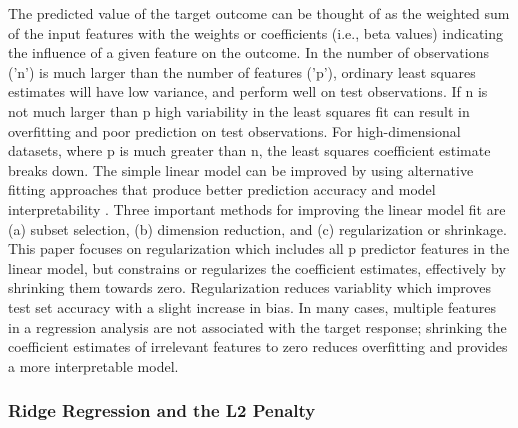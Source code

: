 \documentclass[sigconf]{acmart}
\begin{document}
The predicted value of the target outcome can be thought of as the weighted 
sum of the input features with the weights or coefficients (i.e., beta values) 
indicating the influence of a given feature on the outcome. In the number of
observations ('n') is much larger than the number of features ('p'), ordinary 
least squares estimates will have low variance, and perform well on test
observations. If n is not much larger than p high variability in the least
squares fit can result in overfitting and poor prediction on test observations.
For high-dimensional datasets, where p is much greater than n, the least
squares coefficient estimate breaks down. The simple linear model can be
improved by using alternative fitting approaches that produce better 
prediction accuracy and model interpretability \cite{statlearn13}. Three
important methods for improving the linear model fit are (a) subset selection,
(b) dimension reduction, and (c) regularization or shrinkage. This paper 
focuses on regularization which includes all p predictor features in the
linear model, but constrains or regularizes the coefficient estimates, 
effectively by shrinking them towards zero. Regularization reduces variablity 
which improves test set accuracy with a slight increase in bias. In many cases, 
multiple features in a regression analysis are not associated with the target
response; shrinking the coefficient estimates of irrelevant features to zero 
reduces overfitting and provides a more interpretable model. 

\subsubsection{Ridge Regression and the L2 Penalty} 
\end{document}
